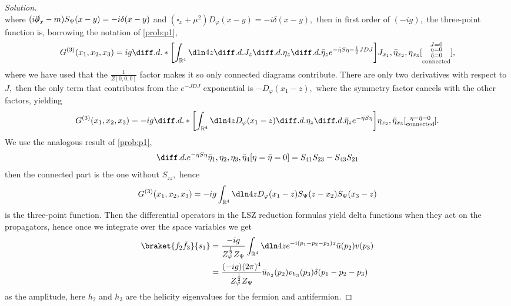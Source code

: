 \begin{proof}[Solution]
\begin{equation*}
   \end{equation*}
   where \((i \slashed{\partial}_{x} - m) S_\Psi(x-y) = -i \delta(x - y)\) and \((\square_x + \mu^2) D_\varphi(x-y) = -i \delta(x - y),\) then in first order of \((-ig),\) the three-point function is, borrowing the notation of \cref{prob:p1},
   \begin{equation*}
      G^{(3)}(x_1,x_2,x_3) = ig\diff.d.*{\left[\int_{\mathbb{R}^4} \dln4z \diff.d.{}{J_z} \diff.d.{}{\eta_z} \diff.d.{}{\bar{\eta}_z}e^{- \bar{\eta} S \eta - \frac12 J D J}\right]}{J_{x_1},\bar{\eta}_{x_2},\eta_{x_3}}[\substack{J = 0\\\eta = 0\\ \bar{\eta} = 0\\\mathrm{connected}}],
   \end{equation*}
   where we have used that the \(\frac{1}{Z[0,0,0]}\) factor makes it so only connected diagrams contribute. There are only two derivatives with respect to \(J,\) then the only term that contributes from the \(e^{-JDJ}\) exponential is \(-D_\varphi(x_1 - z),\) where the symmetry factor cancels with the other factors, yielding
   \begin{equation*}
      G^{(3)}(x_1,x_2,x_3) = -ig\diff.d.*{\left[\int_{\mathbb{R}^4} \dln4z D_\varphi(x_1 - z) \diff.d.{}{\eta_z} \diff.d.{}{\bar{\eta}_z}e^{- \bar{\eta} S \eta}\right]}{\eta_{x_2},\bar{\eta}_{x_3}}[\substack{\eta = \bar{\eta} = 0\\\mathrm{connected}}].
   \end{equation*}
   We use the analogous result of \cref{prob:p1},
   \begin{equation*}
      \diff.d.{e^{- \bar{\eta} S \eta}}{\bar{\eta}_1,\eta_2,\eta_3,\bar{\eta}_4}[\eta = \bar{\eta} = 0] = S_{41}S_{23} - S_{43}S_{21} 
   \end{equation*}
   then the connected part is the one without \(S_{zz},\) hence
   \begin{equation*}
      G^{(3)}(x_1,x_2,x_3) = -ig \int_{\mathbb{R}^4} \dln4z D_\varphi(x_1 - z) S_\Psi(z - x_2) S_\Psi(x_3 - z)
   \end{equation*}
   is the three-point function. Then the differential operators in the LSZ reduction formulas yield delta functions when they act on the propagators, hence once we integrate over the space variables we get
   \begin{align*}
      \braket{f_2 \bar{f}_3}{s_1} &= \frac{-ig}{Z_\varphi^{\frac12} Z_\Psi} \int_{\mathbb{R}^4} \dln4z e^{-i(p_1 - p_2 - p_3)z} \bar{u}(p_2) v(p_3)\\
                                  &= \frac{(-ig)(2\pi)^4}{Z_\varphi^{\frac12} Z_\Psi} \bar{u}_{h_2}(p_2)v_{h_3}(p_3) \delta(p_1 - p_2 - p_3)
   \end{align*}
   as the amplitude, here \(h_2\) and \(h_3\) are the helicity eigenvalues for the fermion and antifermion.


\end{proof}
